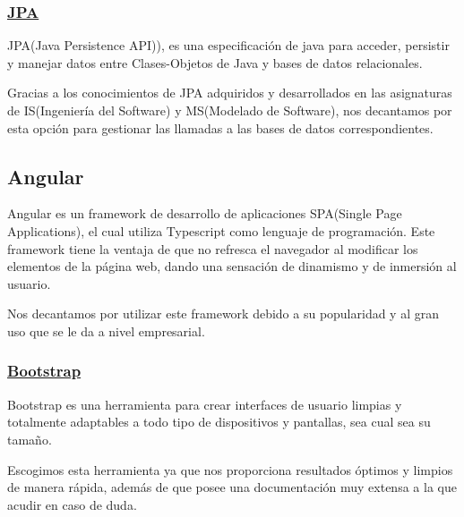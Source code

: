         \subsubsection{\underline{JPA}}
        JPA(Java Persistence API)), es una especificación de java para acceder, persistir y manejar datos entre Clases-Objetos de Java y bases de datos relacionales\cite{jpa}.
        \newline
        
        Gracias a los conocimientos de JPA adquiridos y desarrollados en las asignaturas de IS(Ingeniería del Software) y MS(Modelado de Software), nos decantamos por esta opción para gestionar las llamadas a las bases de datos correspondientes.
        

     \subsection{Angular}
       Angular es un framework de desarrollo de aplicaciones SPA(Single Page Applications), el cual utiliza Typescript como lenguaje de programación. Este framework tiene la ventaja de que no refresca el navegador al modificar los elementos de la página web, dando una sensación de dinamismo y de inmersión al usuario.
       \newline
       
       Nos decantamos por utilizar este framework debido a su popularidad y al gran uso que se le da a nivel empresarial.

        \subsubsection{\underline{Bootstrap}}
         Bootstrap es una herramienta para crear interfaces de usuario limpias y totalmente adaptables a todo tipo de dispositivos y pantallas, sea cual sea su tamaño\cite{bootstrap}.
         \newline
         
         Escogimos esta herramienta ya que nos proporciona resultados óptimos y limpios de manera rápida, además de que posee una documentación muy extensa a la que acudir en caso de duda\cite{documentationboostrap}.

   
     